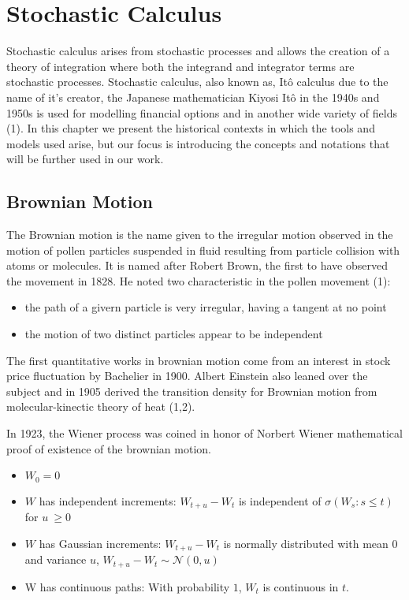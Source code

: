 \documentclass[12pt,twoside]{reedthesis}
\providecommand{\tightlist}{%
  \setlength{\itemsep}{0pt}\setlength{\parskip}{0pt}}
\theoremstyle{definition}
\theoremstyle{definition}
\theoremstyle{remark}
\begin{document}
  \section{Stochastic Calculus}\label{stochastic-calculus}
  
  Stochastic calculus arises from stochastic processes and allows the
  creation of a theory of integration where both the integrand and
  integrator terms are stochastic processes. Stochastic calculus, also
  known as, Itô calculus due to the name of it's creator, the Japanese
  mathematician Kiyosi Itô in the 1940s and 1950s is used for modelling
  financial options and in another wide variety of fields (1). In this
  chapter we present the historical contexts in which the tools and models
  used arise, but our focus is introducing the concepts and notations that
  will be further used in our work.
  
  \subsection{Brownian Motion}\label{brownian-motion}
  
  The Brownian motion is the name given to the irregular motion observed
  in the motion of pollen particles suspended in fluid resulting from
  particle collision with atoms or molecules. It is named after Robert
  Brown, the first to have observed the movement in 1828. He noted two
  characteristic in the pollen movement (1):
  
  \begin{itemize}
  \item
    the path of a givern particle is very irregular, having a tangent at
    no point
  \item
    the motion of two distinct particles appear to be independent
  \end{itemize}
  
  The first quantitative works in brownian motion come from an interest in
  stock price fluctuation by Bachelier in 1900. Albert Einstein also
  leaned over the subject and in 1905 derived the transition density for
  Brownian motion from molecular-kinectic theory of heat (1,2).
  
  In 1923, the Wiener process was coined in honor of Norbert Wiener
  mathematical proof of existence of the brownian motion.
  
  \footnotesize
  
  \begin{itemize}
  \tightlist
  \item
    \(W_{0}=0\)
  \item
    \(W\) has independent increments: \(W_{t+u}-W_{t}\) is independent of
    \(\sigma \left(W_{s}:s\leq t\right)\) for \(u~\geq 0\)
  \item
    \(W\) has Gaussian increments: \(W_{t+u}-W_{t}\) is normally
    distributed with mean \(0\) and variance \(u\),
    \(W_{t+u}-W_{t}\sim {\mathcal {N}}(0,u)\)
  \item
    W has continuous paths: With probability \(1\), \(W_{t}\) is
    continuous in \(t\). \normalsize
  \end{itemize}
  
\end{document}
